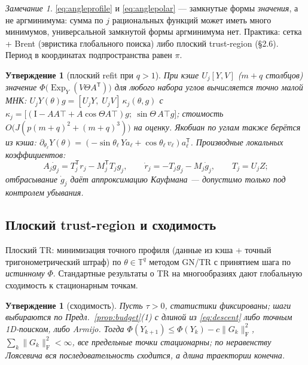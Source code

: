 \documentclass[11pt,a4paper]{article}
\newcommand{\Id}{\mathrm I}
\newcommand{\T}{^{\mathsf T}}
\newcommand{\F}{_{\mathrm F}}
\newcommand{\Exp}{\operatorname{Exp}}
\newtheorem{proposition}[theorem]{Утверждение}
\theoremstyle{remark}
\newtheorem{remark}[theorem]{Замечание}
\begin{document}
\begin{remark}
\eqref{eq:angleprofile} и \eqref{eq:anglepolar} --- замкнутые формы
\emph{значения}, а не аргминимума: сумма по $j$ рациональных функций может
иметь много минимумов, универсальной замкнутой формы аргминимума нет.
Практика: сетка + Brent (эвристика глобального поиска) либо плоский
trust-region (§2.6). Период в координатах подпространства равен $\pi$.
\end{remark}

\begin{proposition}[плоский refit при $q>1$]\label{prop:flatfit}
При кэше $U_j[Y,V]$ ($m+q$ столбцов) значение
 $\Phi\bigl(\Exp_Y(V\Theta A\T)\bigr)$ для любого набора углов вычисляется
точно малой МНК: $U_jY(\theta)g=[U_jY,\;U_jV]\,\kappa_j(\theta,g)$ с
 $\kappa_j=\bigl[(\Id-AA\top+A\cos\Theta A\top)g;\ \sin\Theta\,A\top g\bigr]$;
стоимость $O\bigl(J(p(m+q)^2+(m+q)^3)\bigr)$ на оценку. Якобиан по углам
также берётся из кэша:
 $\partial_{\theta_\ell}Y(\theta)=(-\sin\theta_\ell\,Ya_\ell+\cos\theta_\ell\,v_\ell)a_\ell\T$.
Производные локальных коэффициентов:
\begin{equation}\label{eq:jacobiandg}
 A_j\dot g_j=T_j\T r_j-M_j\T T_jg_j,\qquad
 \dot r_j=-T_jg_j-M_j\dot g_j,\qquad T_j=U_jZ;
\end{equation}
отбрасывание $\dot g_j$ даёт аппроксимацию Кауфмана --- допустимо только
под контролем убывания.
\end{proposition}

\subsection{Плоский trust-region и сходимость}\label{sec:conv}

Плоский TR: минимизация точного профиля (данные из кэша + точный
тригонометрический штраф) по $\theta\in\mathbb T^q$ методом GN/TR
с принятием шага по \emph{истинному} $\Phi$. Стандартные результаты
о TR на многообразиях \cite{abg} дают глобальную сходимость к
стационарным точкам.

\begin{proposition}[сходимость]\label{prop:conv}
Пусть $\tau>0$, статистики фиксированы; шаги выбираются по
Предл.~\ref{prop:budget}(1) с длиной из \eqref{eq:descent} либо точным
1D-поиском, либо Armijo. Тогда
 $\Phi(Y_{k+1})\le\Phi(Y_k)-c\|G_k\|\F^2$,
 $\sum_k\|G_k\|\F^2<\infty$, все предельные точки стационарны;
по неравенству Лоясевича \cite{ama05} вся последовательность сходится,
а длина траектории конечна.
\end{proposition}
\end{document}
